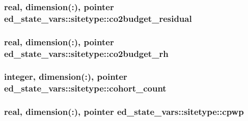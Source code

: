 \subsubsection[{\texorpdfstring{co2budget\+\_\+residual}{co2budget_residual}}]{\setlength{\rightskip}{0pt plus 5cm}real, dimension(\+:), pointer ed\+\_\+state\+\_\+vars\+::sitetype\+::co2budget\+\_\+residual}\hypertarget{structed__state__vars_1_1sitetype_a7d8b202aecfa3c1a50c784752b9171ed}{}\label{structed__state__vars_1_1sitetype_a7d8b202aecfa3c1a50c784752b9171ed}
\subsubsection[{\texorpdfstring{co2budget\+\_\+rh}{co2budget_rh}}]{\setlength{\rightskip}{0pt plus 5cm}real, dimension(\+:), pointer ed\+\_\+state\+\_\+vars\+::sitetype\+::co2budget\+\_\+rh}\hypertarget{structed__state__vars_1_1sitetype_a80da69db3d80f5faeda99dd78dfd15d0}{}\label{structed__state__vars_1_1sitetype_a80da69db3d80f5faeda99dd78dfd15d0}
\subsubsection[{\texorpdfstring{cohort\+\_\+count}{cohort_count}}]{\setlength{\rightskip}{0pt plus 5cm}integer, dimension(\+:), pointer ed\+\_\+state\+\_\+vars\+::sitetype\+::cohort\+\_\+count}\hypertarget{structed__state__vars_1_1sitetype_ae6d021b9276180c0e18f156eb6cb7a8a}{}\label{structed__state__vars_1_1sitetype_ae6d021b9276180c0e18f156eb6cb7a8a}
\subsubsection[{\texorpdfstring{cpwp}{cpwp}}]{\setlength{\rightskip}{0pt plus 5cm}real, dimension(\+:), pointer ed\+\_\+state\+\_\+vars\+::sitetype\+::cpwp}\hypertarget{structed__state__vars_1_1sitetype_a6b392ade4cfa3882afa7dca325c757f7}{}\label{structed__state__vars_1_1sitetype_a6b392ade4cfa3882afa7dca325c757f7}
